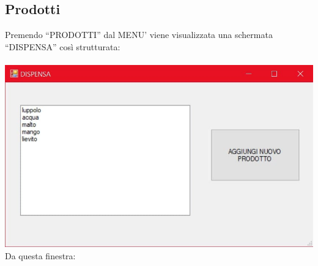 \documentclass[a4paper, titlepage]{article}
\begin{document}
\subsection{Prodotti}
Premendo “PRODOTTI” dal MENU’ viene visualizzata una schermata “DISPENSA” così strutturata:\\\\
\includegraphics[scale=0.30]{Immagini/form/Form GestioneProdotti.jpg}
\\Da questa finestra:
\end{document}
